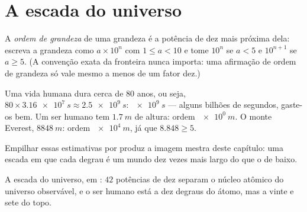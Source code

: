\section{A escada do universo}

\begin{definition}\label{def:g10:orders-of-magnitude:oom}
A \emph{ordem de grandeza} de uma grandeza é a
potência de dez mais próxima dela: escreva a grandeza como
$a \times 10^{n}$ com $1 \leq a < 10$ e tome $10^{n}$ se $a < 5$ e
$10^{n+1}$ se $a \geq 5$. (A convenção exata da fronteira nunca importa:
uma afirmação de ordem de grandeza só vale mesmo a menos de um fator
dez.)
\end{definition}

\begin{example}\label{ex:g10:orders-of-magnitude:oom}
Uma vida humana dura cerca de $80$ anos, ou seja,
$80 \times \qty{3.16e7}{s} \approx \qty{2.5e9}{s}$: 
$\qty{e9}{s}$ --- alguns bilhões de segundos, gaste-os bem. Um ser
humano tem $\qty{1.7}{m}$ de altura: ordem $\qty{e0}{m}$. O monte
Everest, $\qty{8848}{m}$: ordem $\qty{e4}{m}$, já que $8.848 \geq 5$.
\end{example}

Empilhar essas estimativas por  produz a imagem mestra deste
capítulo: uma escada em que cada degrau é um mundo dez vezes mais largo
do que o de baixo.

\begin{omfigure}

{\small A escada do universo, em : $42$ potências de dez separam o
núcleo atômico do universo observável, e o ser humano está a dez degraus
do átomo, mas a vinte e sete do topo.}
\end{omfigure}

